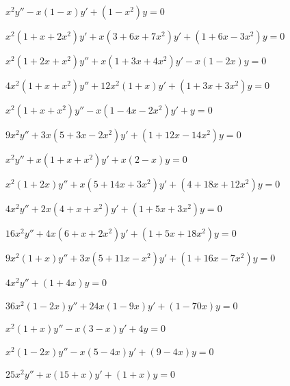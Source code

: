 \begin{exerciselist}

\item\label{exer:7.6.1}\Cex
$x^2y''-x(1-x)y'+(1-x^2)y=0$

\item\label{exer:7.6.2}\Cex
$x^2(1+x+2x^2)y'+x(3+6x+7x^2)y'+(1+6x-3x^2)y=0$

\item\label{exer:7.6.3}\Cex
$x^2(1+2x+x^2)y''+x(1+3x+4x^2)y'-x(1-2x)y=0$

\item\label{exer:7.6.4}\Cex
$4x^2(1+x+x^2)y''+12x^2(1+x)y'+(1+3x+3x^2)y=0$

\item\label{exer:7.6.5}\Cex
$x^2(1+x+x^2)y''-x(1-4x-2x^2)y'+y=0$

\item\label{exer:7.6.6}\Cex
$9x^2y''+3x(5+3x-2x^2)y'+(1+12x-14x^2)y=0$

\item\label{exer:7.6.7}\Cex
$x^2y''+x(1+x+x^2)y'+x(2-x)y=0$

\item\label{exer:7.6.8}\Cex
$x^2(1+2x)y''+x(5+14x+3x^2)y'+(4+18x+12x^2)y=0$

\item\label{exer:7.6.9}\Cex
$4x^2y''+2x(4+x+x^2)y'+(1+5x+3x^2)y=0$

\item\label{exer:7.6.10}\Cex
$16x^2y''+4x(6+x+2x^2)y'+(1+5x+18x^2)y=0$

\item\label{exer:7.6.11}\Cex
$9x^2(1+x)y''+3x(5+11x-x^2)y'+(1+16x-7x^2)y=0$


\item\label{exer:7.6.12}$4x^2y''+(1+4x)y=0$

\item\label{exer:7.6.13}$36x^2(1-2x)y''+24x(1-9x)y'+(1-70x)y=0$

\item\label{exer:7.6.14}$x^2(1+x)y''-x(3-x)y'+4y=0$

\item\label{exer:7.6.15}$x^2(1-2x)y''-x(5-4x)y'+(9-4x)y=0$

\item\label{exer:7.6.16}$25x^2y''+x(15+x)y'+(1+x)y=0$


\end{exerciselist}
